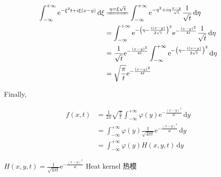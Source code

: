 \begin{example}
    \begin{align*}
        \int_{-\infty}^{+\infty}\mathrm{e}^{-\xi^2t+i\xi(x-y)}\,\mathrm{d}\xi
         & \xlongequal{\eta=\xi\sqrt{t}}\int_{-\infty}^{+\infty}\mathrm{e}^{-\eta^2+i\eta\frac{x-y}{\sqrt{t}}}\frac{1}{\sqrt{t}}\,\mathrm{d}\eta                 \\
         & =\int_{-\infty}^{+\infty}\mathrm{e}^{-\left(\eta-\frac{i(x-y)}{2\sqrt{t}}\right)^2}\mathrm{e}^{-\frac{(x-y)^2}{4t}}\frac{1}{\sqrt{t}}\,\mathrm{d}\eta \\
         & =\frac{1}{\sqrt{t}}\mathrm{e}^{-\frac{(x-y)^2}{4t}}\int_{-\infty}^{+\infty}\mathrm{e}^{-\left(\eta-\frac{i(x-y)}{2\sqrt{t}}\right)^2}\,\mathrm{d}\eta \\
         & =\sqrt{\frac{\pi}{t}}\mathrm{e}^{-\frac{(x-y)^2}{4t}}
    \end{align*}

    Finally,

    \begin{align*}
        f(x,t)
         & =\frac{1}{2\pi}\sqrt{\frac{\pi}{t}}\int_{-\infty}^{+\infty}\varphi(y)\mathrm{e}^{-\frac{(x-y)^2}{4t}}\,\mathrm{d}y \\
         & =\int_{-\infty}^{+\infty}\varphi(y)\frac{1}{\sqrt{4\pi t}}\mathrm{e}^{-\frac{(x-y)^2}{4t}}\,\mathrm{d}y            \\
         & =\int_{-\infty}^{+\infty}\varphi(y)H(x,y,t)\,\mathrm{d}y
    \end{align*}

    $H(x,y,t)=\frac{1}{\sqrt{4\pi t}}\mathrm{e}^{-\frac{(x-y)^2}{4t}}$ Heat kernel 热模
\end{example}